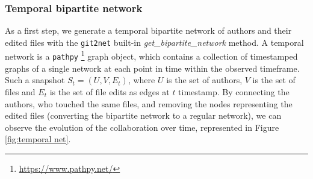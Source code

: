 \subsubsection{Temporal bipartite network}
As a first step, we generate a temporal bipartite network of authors and their edited files with the \texttt{git2net} built-in \textit{get\_bipartite\_network} method. A temporal network is a \texttt{pathpy} \footnote{\url{https://www.pathpy.net/}} graph object, which contains a collection of timestamped graphs of a single network at each point in time within the observed timeframe. Such a snapshot $S_t = (U, V, E_t)$, where $U$ is the set of authors, $V$ is the set of files and $E_t$ is the set of file edits as edges at $t$ timestamp. By connecting the authors, who touched the same files, and removing the nodes representing the edited files (converting the bipartite network to a regular network), we can observe the evolution of the collaboration over time, represented in Figure \ref{fig:temporal net}. \\

